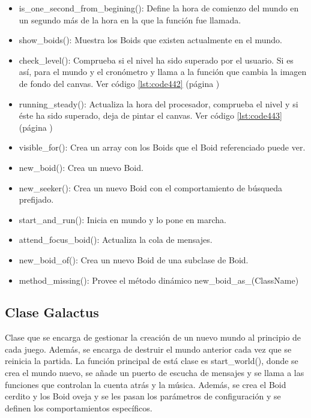 \begin{itemize}
 \item is\_one\_second\_from\_begining():
Define la hora de comienzo del mundo en un segundo más de la hora en la que la función fue llamada.

 \item show\_boids():
Muestra los Boids que existen actualmente en el mundo.

 \item check\_level():
Comprueba si el nivel ha sido superado por el usuario. Si es así, para el mundo y el cronómetro y llama a la función que cambia la imagen 
de fondo del canvas. Ver código \ref{lst:code442} (página \pageref{lst:code442})

 \item running\_steady():
Actualiza la hora del procesador, comprueba el nivel y si éste ha sido superado, deja de pintar el canvas. Ver código \ref{lst:code443} (página \pageref{lst:code443})

 \item visible\_for():
Crea un array con los Boids que el Boid referenciado puede ver.

 \item new\_boid():
Crea un nuevo Boid.

 \item new\_seeker():
Crea un nuevo Boid con el comportamiento de búsqueda prefijado.

 \item start\_and\_run():
Inicia en mundo y lo pone en marcha.

 \item attend\_focus\_boid():
Actualiza la cola de mensajes.

 \item new\_boid\_of():
Crea un nuevo Boid de una subclase de Boid.

 \item method\_missing():
Provee el método dinámico new\_boid\_as\_(ClassName)
\end{itemize}


\subsection{Clase Galactus}
\label{subsection:galactus}

Clase que se encarga de gestionar la creación de un nuevo mundo al principio de cada juego. Además, se encarga de destruir el mundo 
anterior cada vez que se reinicia la partida. La función principal de está clase es start\_world(), donde se crea el mundo nuevo, se añade 
un puerto de escucha de mensajes y se llama a las funciones que controlan la cuenta atrás y la música. Además, se crea el Boid cerdito y 
los Boid oveja y se les pasan los parámetros de configuración y se definen los comportamientos específicos.\\

